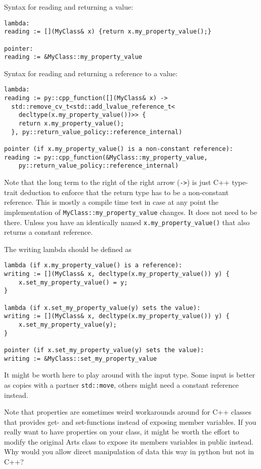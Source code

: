 Syntax for reading and returning a value:
\begin{verbatim}
lambda:
reading := [](MyClass& x) {return x.my_property_value();}

pointer:
reading := &MyClass::my_property_value
\end{verbatim}

Syntax for reading and returning a reference to a value:
\begin{verbatim}
lambda:
reading := py::cpp_function([](MyClass& x) -> 
  std::remove_cv_t<std::add_lvalue_reference_t<
  	decltype(x.my_property_value())>> {
    return x.my_property_value();
  }, py::return_value_policy::reference_internal)

pointer (if x.my_property_value() is a non-constant reference):
reading := py::cpp_function(&MyClass::my_property_value,
    py::return_value_policy::reference_internal)
\end{verbatim}
Note that the long term to the right of the right arrow (\verb|->|) is just C++ type-trait deduction to
enforce that the return type has to be a non-constant reference.  This is mostly
a compile time test in case at any point the implementation of \verb|MyClass::my_property_value|
changes.  It does not need to be there.  Unless you have an identically named \verb|x.my_property_value()|
that also returns a constant reference.

The writing lambda should be defined as
\begin{verbatim}
lambda (if x.my_property_value() is a reference):
writing := [](MyClass& x, decltype(x.my_property_value()) y) {
    x.set_my_property_value() = y;
}

lambda (if x.set_my_property_value(y) sets the value):
writing := [](MyClass& x, decltype(x.my_property_value()) y) {
    x.set_my_property_value(y);
}

pointer (if x.set_my_property_value(y) sets the value):
writing := &MyClass::set_my_property_value
\end{verbatim}
It might be worth here to play around with the input type.  Some input
is better as copies with a partner \verb|std::move|, others might need
a constant reference instead.

Note that properties are sometimes weird workarounds around for C++ classes that provides get- and set-functions
instead of exposing member variables.  If you really want to have properties on your class, it might be worth
the effort to modify the original Arts class to expose its members variables in public instead.  Why would you
allow direct manipulation of data this way in python but not in C++?

